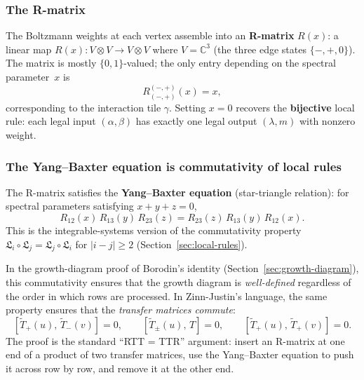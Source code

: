 \documentclass[11pt]{article}
\theoremstyle{plain}
\theoremstyle{definition}
\theoremstyle{remark}
\begin{document}
\subsubsection*{The R-matrix}

The Boltzmann weights at each vertex assemble into an
\textbf{R-matrix} $R(x)$: a linear map
$R(x) : V \otimes V \to V \otimes V$ where $V = \mathbb{C}^3$
(the three edge states $\{-, +, 0\}$).
The matrix is mostly $\{0, 1\}$-valued; the only entry depending
on the spectral parameter~$x$ is
\[
  R_{(-,+)}^{(-,+)}(x) = x,
\]
corresponding to the interaction tile $\gamma$.
Setting $x = 0$ recovers the \textbf{bijective} local rule:
each legal input $(\alpha, \beta)$ has exactly one legal output
$(\lambda, m)$ with nonzero weight.

\subsubsection*{The Yang--Baxter equation is commutativity of local rules}

The R-matrix satisfies the \textbf{Yang--Baxter equation}
(star-triangle relation): for spectral parameters satisfying
$x + y + z = 0$,
\[
  R_{12}(x)\, R_{13}(y)\, R_{23}(z)
  = R_{23}(z)\, R_{13}(y)\, R_{12}(x).
\]
This is the integrable-systems version of the commutativity
property
$\mathfrak{L}_i \circ \mathfrak{L}_j
= \mathfrak{L}_j \circ \mathfrak{L}_i$ for $|i-j| \geq 2$
(Section~\ref{sec:local-rules}).

In the growth-diagram proof of Borodin's identity
(Section~\ref{sec:growth-diagram}), this commutativity ensures
that the growth diagram is \emph{well-defined} regardless of
the order in which rows are processed.
In Zinn-Justin's language, the same property ensures that
the \emph{transfer matrices commute}:
\[
  [\widetilde{T}_+(u),\, \widetilde{T}_-(v)] = 0,
  \qquad
  [\widetilde{T}_\pm(u),\, T] = 0,
  \qquad
  [\widetilde{T}_+(u),\, \widetilde{T}_+(v)] = 0.
\]
The proof is the standard ``RTT = TTR'' argument: insert an
R-matrix at one end of a product of two transfer matrices, use
the Yang--Baxter equation to push it across row by row, and
remove it at the other end.
\end{document}
